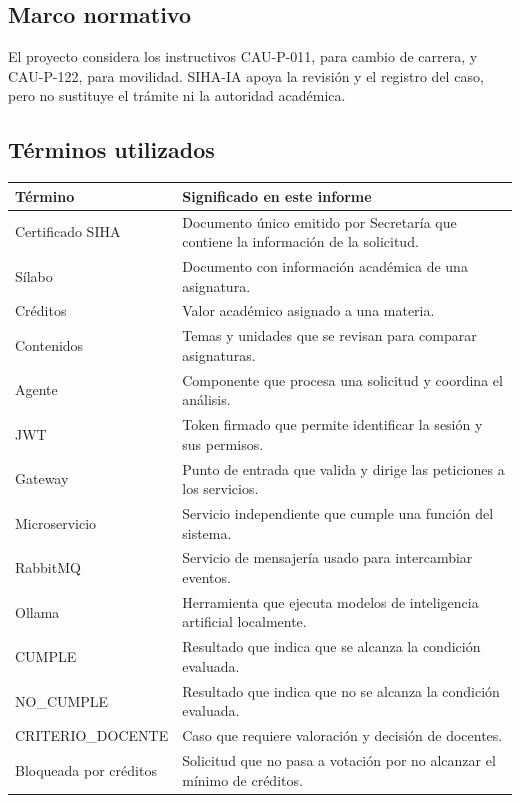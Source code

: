 \subsection{Marco normativo}
El proyecto considera los instructivos CAU-P-011, para cambio de carrera, y CAU-P-122, para movilidad. SIHA-IA apoya la revisión y el registro del caso, pero no sustituye el trámite ni la autoridad académica.

\subsection{Términos utilizados}
\begin{tabularx}{\textwidth}{|p{}|X|}\hline
\rowcolor{grisTarjeta}\textbf{Término} & \textbf{Significado en este informe}\\\hline
Certificado SIHA & Documento único emitido por Secretaría que contiene la información de la solicitud.\\\hline
Sílabo & Documento con información académica de una asignatura.\\\hline
Créditos & Valor académico asignado a una materia.\\\hline
Contenidos & Temas y unidades que se revisan para comparar asignaturas.\\\hline
Agente & Componente que procesa una solicitud y coordina el análisis.\\\hline
JWT & Token firmado que permite identificar la sesión y sus permisos.\\\hline
Gateway & Punto de entrada que valida y dirige las peticiones a los servicios.\\\hline
Microservicio & Servicio independiente que cumple una función del sistema.\\\hline
RabbitMQ & Servicio de mensajería usado para intercambiar eventos.\\\hline
Ollama & Herramienta que ejecuta modelos de inteligencia artificial localmente.\\\hline
CUMPLE & Resultado que indica que se alcanza la condición evaluada.\\\hline
NO\_CUMPLE & Resultado que indica que no se alcanza la condición evaluada.\\\hline
CRITERIO\_DOCENTE & Caso que requiere valoración y decisión de docentes.\\\hline
Bloqueada por créditos & Solicitud que no pasa a votación por no alcanzar el mínimo de créditos.\\\hline
\end{tabularx}

